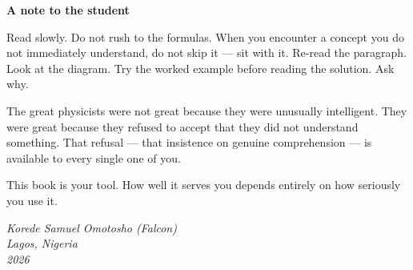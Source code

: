 \vspace{0.5cm}

\textbf{A note to the student}

\vspace{0.3cm}

Read slowly. Do not rush to the formulas. When you encounter
a concept you do not immediately understand, do not skip it ---
sit with it. Re-read the paragraph. Look at the diagram.
Try the worked example before reading the solution. Ask why.

The great physicists were not great because they were
unusually intelligent. They were great because they refused
to accept that they did not understand something. That refusal
--- that insistence on genuine comprehension --- is available
to every single one of you.

This book is your tool. How well it serves you depends
entirely on how seriously you use it.

\vspace{1cm}

\begin{flushright}
\textit{Korede Samuel Omotosho (Falcon)}\\
\textit{Lagos, Nigeria}\\
\textit{2026}
\end{flushright}
